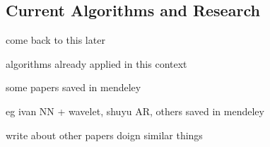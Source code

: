     \subsection{Current Algorithms and Research}
    \label{subsec:bg-litreview-currentalgs}
        \begin{sitemize}
            \item{come back to this later}
            \item{algorithms already applied in this context}
            \item{some papers saved in mendeley}
            \item{eg ivan NN + wavelet, shuyu AR, others saved in mendeley}
            \item{write about other papers doign similar things}
        \end{sitemize}
